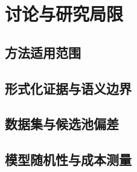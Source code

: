 \section{讨论与研究局限}
\mbox{}\par
\subsection{方法适用范围}
\mbox{}\par
\subsection{形式化证据与语义边界}
\mbox{}\par
\subsection{数据集与候选池偏差}
\mbox{}\par
\subsection{模型随机性与成本测量}
\mbox{}\par
